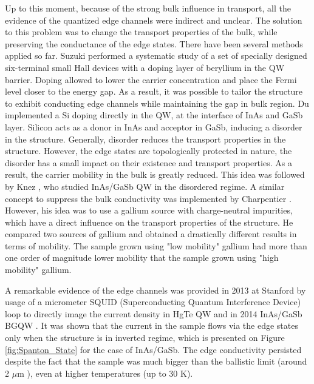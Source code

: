 \documentclass[titlepage,a4paper]{book}
\begin{document}
Up to this moment, because of the strong bulk influence in transport, all the evidence of the quantized edge channels were indirect and unclear. The solution to this problem was to change the transport properties of the bulk, while preserving the conductance of the edge states.
There have been several methods applied so far.  
Suzuki \cite{Suzuki_State} performed a systematic study of a set of specially designed six-terminal small Hall devices with a doping layer of beryllium in the QW barrier. Doping allowed to lower the carrier concentration and place the Fermi level closer to the energy gap. As a result, it was possible to tailor the structure to exhibit conducting edge channels while maintaining the gap in bulk region. Du \cite{Du_State} implemented a Si doping directly in the QW, at the interface of InAs and GaSb layer. Silicon acts as a donor in InAs and acceptor in GaSb, inducing a disorder in the structure. Generally, disorder reduces the transport properties in the structure. However, the edge states are topologically protected in nature, the disorder has a small impact on their existence and transport properties. As a result, the carrier mobility in the bulk is greatly reduced. This idea was followed by Knez \cite{Knez3_State}, who studied InAs/GaSb QW in the disordered regime. A similar concept to suppress the bulk conductivity was implemented by Charpentier \cite{Charpentier_State}. However, his idea was to use a gallium source with charge-neutral impurities, which have a direct influence on the transport properties of the structure. He compared two sources of gallium and obtained a drastically different results in terms of mobility. The sample grown using "low mobility" gallium had more than one order of magnitude lower mobility that the sample grown using "high mobility" gallium. 

A remarkable evidence of the edge channels was provided in 2013 at Stanford by usage of a micrometer SQUID (Superconducting Quantum Interference Device) loop \cite{Huber_State} to directly image the current density in HgTe QW \cite{Nowack_State} and in 2014 InAs/GaSb BGQW \cite{Spanton_State}. It was shown that the current in the sample flows via the edge states only when the structure is in inverted regime, which is presented on Figure \ref{fig:Spanton_State} for the case of InAs/GaSb. The edge conductivity persisted despite the fact that the sample was much bigger than the ballistic limit (around 2 $\mu$m \cite{Knez2_State}), even at higher temperatures (up to 30 K). 
\end{document}
